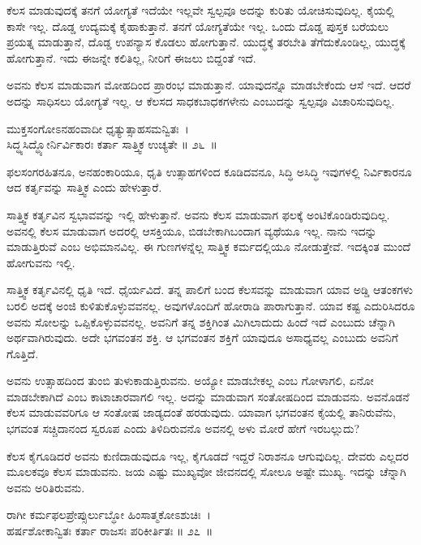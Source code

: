 ಕೆಲಸ ಮಾಡುವುದಕ್ಕೆ ತನಗೆ ಯೋಗ್ಯತೆ ಇದೆಯೇ ಇಲ್ಲವೇ ಸ್ವಲ್ಪವೂ ಅದನ್ನು ಕುರಿತು ಯೋಚಿಸುವುದಿಲ್ಲ. ಕೈಯಲ್ಲಿ ಕಾಸೇ ಇಲ್ಲ. ದೊಡ್ಡ ಉದ್ಯಮಕ್ಕೆ ಕೈಹಾಕುತ್ತಾನೆ. ತನಗೆ ಯೋಗ್ಯತೆಯೇ ಇಲ್ಲ. ಒಂದು ದೊಡ್ಡ ಪುಸ್ತಕ ಬರೆಯಲು ಪ್ರಯತ್ನ ಮಾಡುತ್ತಾನೆ, ದೊಡ್ಡ ಉಪನ್ಯಾಸ ಕೊಡಲು ಹೋಗುತ್ತಾನೆ. ಯುದ್ಧಕ್ಕೆ ತರಬೇತಿ ತೆಗೆದುಕೊಂಡಿಲ್ಲ, ಯುದ್ಧಕ್ಕೆ ಹೋಗುತ್ತಾನೆ. ಇದು ಈಜನ್ನೇ ಕಲಿತಿಲ್ಲ, ನೀರಿಗೆ ಈಜಲು ಬಿದ್ದಂತೆ ಇದೆ.

\newpage

ಅವನು ಕೆಲಸ ಮಾಡುವಾಗ ಮೋಹದಿಂದ ಪ್ರಾರಂಭ ಮಾಡುತ್ತಾನೆ. ಯಾವುದನ್ನೊ ಮಾಡಬೇಕೆಂದು ಆಸೆ ಇದೆ. ಆದರೆ ಅದನ್ನು ಸಾಧಿಸಲು ಯೋಗ್ಯತೆ ಇಲ್ಲ. ಆ ಕೆಲಸದ ಸಾಧಕಬಾಧಕಗಳೇನು ಎಂಬುದನ್ನು ಸ್ವಲ್ಪವೂ ವಿಚಾರಿಸುವುದಿಲ್ಲ.

\begin{shloka}
ಮುಕ್ತಸಂಗೋಽನಹಂವಾದೀ ಧೃತ್ಯುತ್ಸಾಹಸಮನ್ವಿತಃ~।\\ಸಿದ್ಧ್ಯಸಿದ್ಧ್ಯೋರ್ನಿರ್ವಿಕಾರಃ ಕರ್ತಾ ಸಾತ್ತ್ವಿಕ ಉಚ್ಯತೇ \hfill॥ ೨೬~॥
\end{shloka}

\begin{artha}
ಫಲಸಂಗರಹಿತನೂ, ಅನಹಂಕಾರಿಯೂ, ಧೃತಿ ಉತ್ಸಾಹಗಳಿಂದ ಕೂಡಿದವನೂ, ಸಿದ್ಧಿ ಅಸಿದ್ಧಿ ಇವುಗಳಲ್ಲಿ ನಿರ್ವಿಕಾರನೂ ಆದ ಕರ್ತೃವನ್ನು ಸಾತ್ತ್ವಿಕ ಎಂದು ಹೇಳುತ್ತಾರೆ.
\end{artha}

ಸಾತ್ತ್ವಿಕ ಕರ್ತೃವಿನ ಸ್ವಭಾವವನ್ನು ಇಲ್ಲಿ ಹೇಳುತ್ತಾನೆ. ಅವನು ಕೆಲಸ ಮಾಡುವಾಗ ಫಲಕ್ಕೆ ಅಂಟಿಕೊಂಡಿರುವುದಿಲ್ಲ. ಅವನಲ್ಲಿ ಕೆಲಸ ಮಾಡುವಾಗ ಅದರಲ್ಲಿ ಆಸಕ್ತಿಯೂ, ಬಿಡಬೇಕಾಗಿ\break ಬಂದಾಗ ವ್ಯಥೆಯೂ ಇಲ್ಲ. ನಾನು ಇದನ್ನು ಮಾಡುತ್ತಿರುವೆ ಎಂಬ ಅಭಿಮಾನವಿಲ್ಲ. ಈ ಗುಣಗಳನ್ನೆಲ್ಲ ಸಾತ್ತ್ವಿಕ ಕರ್ಮದಲ್ಲಿಯೂ ನೋಡುತ್ತೇವೆ. ಇದಕ್ಕಿಂತ ಮುಂದೆ ಹೋಗುವನು ಇಲ್ಲಿ.

ಸಾತ್ತ್ವಿಕ ಕರ್ತೃವಿನಲ್ಲಿ ಧೃತಿ ಇದೆ. ಧೈರ್ಯವಿದೆ. ತನ್ನ ಪಾಲಿಗೆ ಬಂದ ಕೆಲಸವನ್ನು ಮಾಡುವಾಗ ಯಾವ ಅಡ್ಡಿ ಆತಂಕಗಳು ಬರಲಿ ಅದಕ್ಕೆ ಅಂಜಿ ಕುಳಿತುಕೊಳ್ಳುವವನಲ್ಲ. ಅವುಗಳೊಂದಿಗೆ ಹೋರಾಡಿ ಪಾರಾಗುತ್ತಾನೆ. ಯಾವ ಕಷ್ಟ ಎದುರಿಸಿದರೂ ಅವನು ಸೋಲನ್ನು ಒಪ್ಪಿಕೊಳ್ಳುವವನಲ್ಲ. ಅವನಿಗೆ ತನ್ನ ಶಕ್ತಿಗಿಂತ ಮಿಗಿಲಾದುದು ಹಿಂದೆ ಇದೆ ಎಂಬುದು ಚೆನ್ನಾಗಿ ಅರ್ಥವಾಗಿರುವುದು. ಅದೇ ಭಗವಂತನ ಶಕ್ತಿ. ಆ ಭಗವಂತನ ಶಕ್ತಿಗೆ ಯಾವುದೂ ಅಸಾಧ್ಯವಲ್ಲ ಎಂಬುದು ಅವನಿಗೆ ಗೊತ್ತಿದೆ.

ಅವನು ಉತ್ಸಾಹದಿಂದ ತುಂಬಿ ತುಳುಕಾಡುತ್ತಿರುವನು. ಅಯ್ಯೋ ಮಾಡಬೇಕಲ್ಲ ಎಂಬ ಗೋಳಾಗಲಿ, ಏನೋ ಮಾಡಬೇಕಾಗಿದೆ ಎಂಬ ಕಾಟಾಚಾರವಾಗಲಿ ಇಲ್ಲ. ಅದನ್ನು ಮಾಡುವಾಗ ಸಂತೋಷದಿಂದ ಮಾಡುವನು. ಅವನೊಡನೆ ಕೆಲಸ ಮಾಡುವವರಿಗೂ ಆ ಸಂತೋಷ ಜಾಡ್ಯದಂತೆ ಹರಡುವುದು. ಯಾವಾಗ ಭಗವಂತನ ಕೈಯಲ್ಲಿ ತಾನಿರುವೆನು, ಭಗವಂತ ಸಚ್ಚಿದಾನಂದ ಸ್ವರೂಪ ಎಂದು ತಿಳಿದಿರುವನೊ ಅವನಲ್ಲಿ ಅಳು ಮೋರೆ ಹೇಗೆ ಇರಬಲ್ಲುದು?

ಕೆಲಸ ಕೈಗೂಡಿದರೆ ಅವನು ಕುಣಿದಾಡುವುದೂ ಇಲ್ಲ, ಕೈಗೂಡದೆ ಇದ್ದರೆ ನಿರಾಶನೂ ಆಗುವುದಿಲ್ಲ. ದೇವರು ಎಲ್ಲದರ ಮೂಲಕವೂ ಕೆಲಸ ಮಾಡುವನು. ಜಯ ಎಷ್ಟು ಮುಖ್ಯವೋ ಜೀವನದಲ್ಲಿ ಸೋಲೂ ಅಷ್ಟೇ ಮುಖ್ಯ. ಇದನ್ನು ಚೆನ್ನಾಗಿ ಅವನು ಅರಿತಿರುವನು.

\begin{shloka}
ರಾಗೀ ಕರ್ಮಫಲಪ್ರೇಪ್ಸುರ್ಲುಬ್ಧೋ ಹಿಂಸಾತ್ಮಕೋಽಶುಚಿಃ~।\\ಹರ್ಷಶೋಕಾನ್ವಿತಃ ಕರ್ತಾ ರಾಜಸಃ ಪರಿಕೀರ್ತಿತಃ \hfill॥ ೨೭~॥
\end{shloka}

